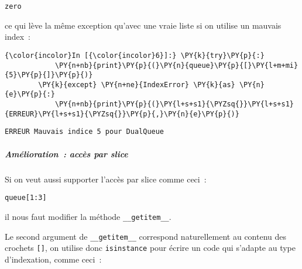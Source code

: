     \begin{Verbatim}[commandchars=\\\{\}]
zero

    \end{Verbatim}

    ce qui lève la même exception qu'avec une vraie liste si on utilise un
mauvais index~:

    \begin{Verbatim}[commandchars=\\\{\}]
{\color{incolor}In [{\color{incolor}6}]:} \PY{k}{try}\PY{p}{:}
            \PY{n+nb}{print}\PY{p}{(}\PY{n}{queue}\PY{p}{[}\PY{l+m+mi}{5}\PY{p}{]}\PY{p}{)}
        \PY{k}{except} \PY{n+ne}{IndexError} \PY{k}{as} \PY{n}{e}\PY{p}{:}
            \PY{n+nb}{print}\PY{p}{(}\PY{l+s+s1}{\PYZsq{}}\PY{l+s+s1}{ERREUR}\PY{l+s+s1}{\PYZsq{}}\PY{p}{,}\PY{n}{e}\PY{p}{)}
\end{Verbatim}


    \begin{Verbatim}[commandchars=\\\{\}]
ERREUR Mauvais indice 5 pour DualQueue

    \end{Verbatim}

    \hypertarget{amuxe9lioration-accuxe8s-par-slice}{%
\subparagraph{Amélioration~: accès par
slice}\label{amuxe9lioration-accuxe8s-par-slice}}

    Si on veut aussi supporter l'accès par slice comme ceci~:

\begin{verbatim}
queue[1:3]
\end{verbatim}

il nous faut modifier la méthode \texttt{\_\_getitem\_\_}.

    Le second argument de \texttt{\_\_getitem\_\_} correspond naturellement
au contenu des crochets \texttt{{[}{]}}, on utilise donc
\texttt{isinstance} pour écrire un code qui s'adapte au type
d'indexation, comme ceci~:

